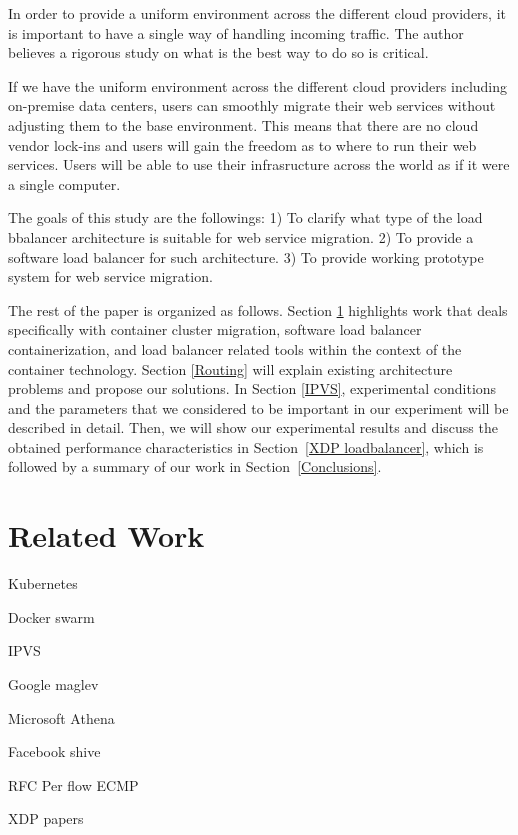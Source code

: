 In order to provide a uniform environment across the different cloud providers, it is important to have a single way of handling incoming traffic.
The author believes a rigorous study on what is the best way to do so is critical.

If we have the uniform environment across the different cloud providers including on-premise data centers, users can smoothly migrate their web services without adjusting them to the base environment.
This means that there are no cloud vendor lock-ins and users will gain the freedom as to where to run their web services.
Users will be able to use their infrasructure across the world as if it were a single computer.

The goals of this study are the followings:
1) To clarify what type of the load bbalancer architecture is suitable for web service migration.
2) To provide a software load balancer for such architecture.
3) To provide working prototype system for web service migration.

The rest of the paper is organized as follows.
Section \ref{Related Work} highlights work that deals specifically with container cluster migration, 
software load balancer containerization, and load balancer related tools within the context of the container technology. 
Section \ref{Routing} will explain existing architecture problems and propose our solutions.
In Section \ref{IPVS}, experimental conditions and the parameters 
that we considered to be important in our experiment will be described in detail.
Then, we will show our experimental results and discuss the obtained performance characteristics in Section~\ref{XDP loadbalancer},  
which is followed by a summary of our work in Section~\ref{Conclusions}.

\section{Related Work}\label{Related Work}

Kubernetes

Docker swarm

IPVS

Google maglev

Microsoft Athena

Facebook shive

RFC Per flow ECMP  

XDP papers

